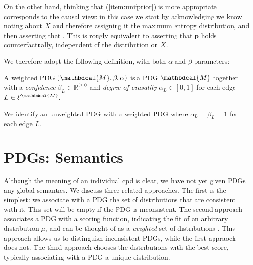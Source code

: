\documentclass{article}
\theoremstyle{plain}
\theoremstyle{definition}
\theoremstyle{remark}
\newcommand\mat[1]{\mathbf{#1}}
\newcommand{\Ed}{\mathcal E}
\newcommand{\dg}[1]{\mathbdcal{#1}}
\numberwithin{equation}{section}
\begin{document}
{\begin{example}
		
		On the other hand, thinking that (\ref{item:unifprior}) is more appropriate corresponds to the causal view: in this case we start by acknowledging we know noting about $X$ and therefore assigning it the maximum entropy distribution, and then asserting that . This is rougly equivalent to asserting that $\mat p$ holds counterfactually, independent of the distribution on $X$. 
	\end{example}
	
	We therefore adopt the following definition, with both $\alpha$ and $\beta$ parameters:

	\begin{defn}
		A weighted PDG $(\dg M, \vec \beta, \vec \alpha)$ is a PDG
	        $\dg M$ together with a \emph{confidence} $\beta_L \in \mathbb
	        R^{\geq 0}$ and \emph{degree of causality} $\alpha_L \in
	        [0,1]$ for each edge $L \in \Ed^\dg M$. 
	\end{defn}

	We identify an unweighted PDG with a weighted PDG where $\alpha_L
	= \beta_L = 1$ for each edge $L$.
}
\section{PDGs: Semantics}\label{sec:semantics}
Although the meaning of an individual cpd is clear, we have not yet given PDGs
any global semantics. We discuss three related approaches. The first is the
simplest: we associate with a PDG the set of distributions that are consistent
with it. This set will be empty if the PDG is inconsistent.
%
The second approach associates a PDG with a scoring function, indicating the fit
of an arbitrary distribution $\mu$, and can be thought of as a \emph{weighted}
set of distributions \cite{HL12}. This approach allows us to distinguish
inconsistent PDGs, while the first appraoch does not. The third approach chooses
the distributions with the best score, typically associating with a PDG a unique
distribution.
\end{document}
